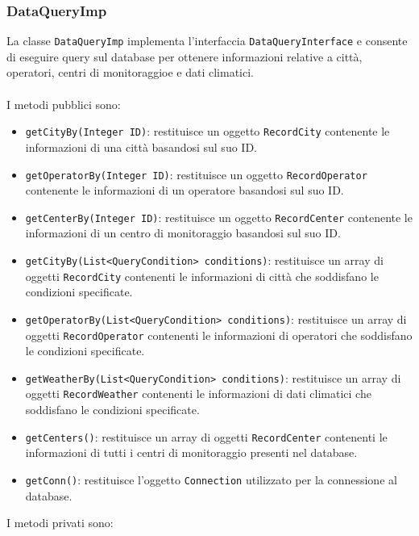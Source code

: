 \subsubsection{DataQueryImp}
La classe \texttt{DataQueryImp} implementa l'interfaccia \texttt{DataQueryInterface} e consente di eseguire query sul database per ottenere informazioni relative a città, operatori, centri di monitoraggioe e dati climatici.\\
\\
I metodi pubblici sono:
\begin{itemize}
    \item \texttt{getCityBy(Integer ID)}: restituisce un oggetto \texttt{RecordCity} contenente le informazioni di una città basandosi sul suo ID.
    \item \texttt{getOperatorBy(Integer ID)}: restituisce un oggetto \texttt{RecordOperator} contenente le informazioni di un operatore basandosi sul suo ID.
    \item \texttt{getCenterBy(Integer ID)}: restituisce un oggetto \texttt{RecordCenter} contenente le informazioni di un centro di monitoraggio basandosi sul suo ID.
    \item \texttt{getCityBy(List<QueryCondition> conditions)}: restituisce un array di oggetti \texttt{RecordCity} contenenti le informazioni di città che soddisfano le condizioni specificate.
    \item \texttt{getOperatorBy(List<QueryCondition> conditions)}: restituisce un array di oggetti \texttt{RecordOperator} contenenti le informazioni di operatori che soddisfano le condizioni specificate.
    \item \texttt{getWeatherBy(List<QueryCondition> conditions)}: restituisce un array di oggetti \texttt{RecordWeather} contenenti le informazioni di dati climatici che soddisfano le condizioni specificate.
    \item \texttt{getCenters()}: restituisce un array di oggetti \texttt{RecordCenter} contenenti le informazioni di tutti i centri di monitoraggio presenti nel database.
    \item \texttt{getConn()}: restituisce l'oggetto \texttt{Connection} utilizzato per la connessione al database.
\end{itemize}
I metodi privati sono:
